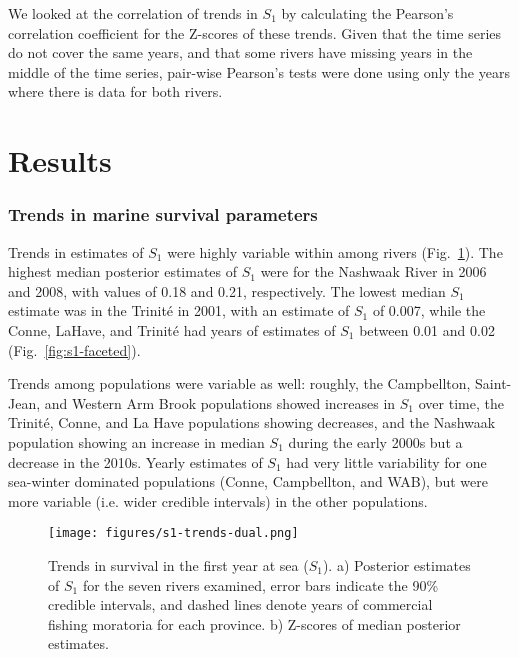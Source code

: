 \documentclass[12pt]{article}
\newcommand{\So}{$S_{1}$\xspace}
\newcommand{\comment}[1]{\par {\bfseries \color{blue} #1 \par}} %
\begin{document}

We looked at the correlation of trends in \So by calculating the Pearson's
correlation coefficient for the Z-scores of these trends. Given that the time
series do not cover the same years, and that some rivers have missing years in
the middle of the time series, pair-wise Pearson's tests were done using only
the years where there is data for both rivers.

\section*{Results}


\subsubsection*{Trends in marine survival parameters}

Trends in estimates of \So were highly variable within among rivers
(Fig.~\ref{fig:s1-dual}). The highest median posterior estimates of \So
were for the Nashwaak River in 2006 and 2008, with values of 0.18 and 0.21,
respectively. The lowest median \So estimate was in the Trinit\'{e} in 2001,
with an estimate of \So of 0.007, while the Conne, LaHave, and Trinit\'{e} had
years of estimates of \So between 0.01 and 0.02 (Fig.~\ref{fig:s1-faceted}).

Trends among populations were variable as well: roughly, the Campbellton,
Saint-Jean, and Western Arm Brook populations showed increases in \So
over time, the Trinit\'{e}, Conne, and La Have populations showing decreases,
and the Nashwaak population showing an increase in median \So during the early
2000s but a decrease in the 2010s. Yearly estimates of \So had very little
variability for one sea-winter dominated populations (Conne, Campbellton, and
WAB), but were more variable (i.e. wider credible intervals) in the other
populations.

\begin{figure}[htbp] \centering
    \texttt{[image: figures/s1-trends-dual.png]}
    \caption{Trends in survival in the first year at sea (\So). a) Posterior
        estimates of \So for the seven rivers examined, error bars indicate
        the 90\% credible intervals, and dashed lines denote years of commercial
        fishing moratoria for each province. b) Z-scores of median posterior
        estimates.} \label{fig:s1-dual} \end{figure}
\end{document}
